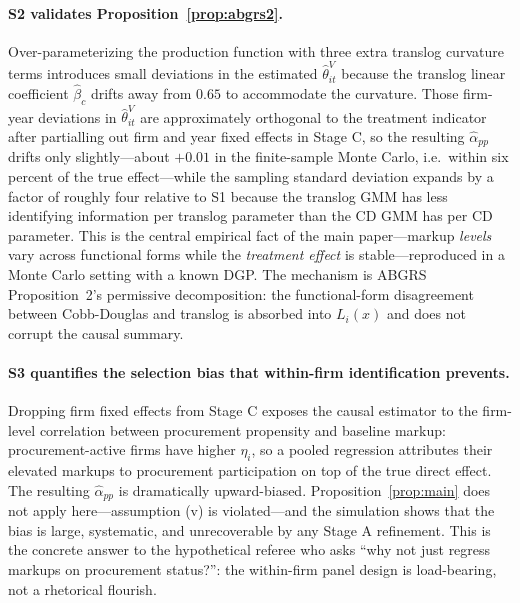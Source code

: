 \documentclass[11pt]{article}
\begin{document}
\paragraph{S2 validates Proposition~\ref{prop:abgrs2}.} Over-parameterizing the production function with three extra translog curvature terms introduces small deviations in the estimated $\hat\theta^V_{it}$ because the translog linear coefficient $\hat\beta_c$ drifts away from $0.65$ to accommodate the curvature. Those firm-year deviations in $\hat\theta^V_{it}$ are approximately orthogonal to the treatment indicator after partialling out firm and year fixed effects in Stage C, so the resulting $\hat\alpha_{pp}$ drifts only slightly---about $+0.01$ in the finite-sample Monte Carlo, i.e.\ within six percent of the true effect---while the sampling standard deviation expands by a factor of roughly four relative to S1 because the translog GMM has less identifying information per translog parameter than the CD GMM has per CD parameter. This is the central empirical fact of the main paper---markup \emph{levels} vary across functional forms while the \emph{treatment effect} is stable---reproduced in a Monte Carlo setting with a known DGP. The mechanism is ABGRS Proposition~2's permissive decomposition: the functional-form disagreement between Cobb-Douglas and translog is absorbed into $L_i(x)$ and does not corrupt the causal summary.

\paragraph{S3 quantifies the selection bias that within-firm identification prevents.} Dropping firm fixed effects from Stage C exposes the causal estimator to the firm-level correlation between procurement propensity and baseline markup: procurement-active firms have higher $\eta_i$, so a pooled regression attributes their elevated markups to procurement participation on top of the true direct effect. The resulting $\hat\alpha_{pp}$ is dramatically upward-biased. Proposition~\ref{prop:main} does not apply here---assumption (v) is violated---and the simulation shows that the bias is large, systematic, and unrecoverable by any Stage A refinement. This is the concrete answer to the hypothetical referee who asks ``why not just regress markups on procurement status?'': the within-firm panel design is load-bearing, not a rhetorical flourish.
\end{document}
